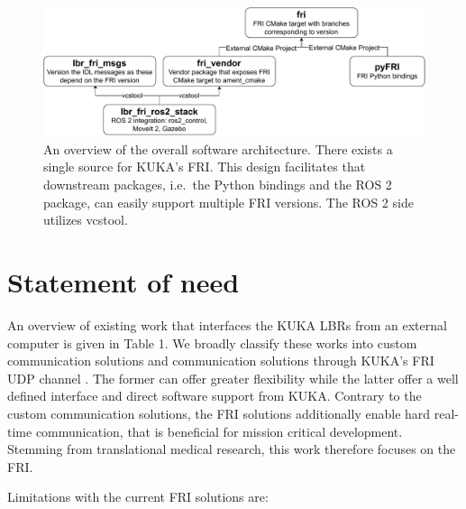 \begin{figure}
\centering
\includegraphics[width=\textwidth]{appendix_1/img/fri_dependency_architecture.pdf}
\caption[An overview of the overall software architecture. There exists
a single source for KUKA's FRI. This design facilitates that downstream
packages, i.e.~the Python bindings and the ROS 2 package, can easily
support multiple FRI versions. The ROS 2 side utilizes
vcstool.\label{fig:fri}]{An overview of the overall software
architecture. There exists a single source for KUKA's FRI. This design
facilitates that downstream packages, i.e.~the Python bindings and the
ROS 2 package, can easily support multiple FRI versions. The ROS 2 side
utilizes vcstool\footnotemark{}.\label{fig:fri}}
\end{figure}

\hypertarget{statement-of-need}{%
\section{Statement of need}\label{statement-of-need}}

An overview of existing work that interfaces the KUKA LBRs from an
external computer is given in Table 1. We broadly classify these works
into custom communication solutions
\cite{ref-iiwa_stack,ref-kuka_sunrise_toolbox,ref-libiiwa} and
communication solutions through KUKA's FRI UDP channel 
\cite{ref-iiwa_ros2,ref-iiwa_ros}. The
former can offer greater flexibility while the latter offer a well
defined interface and direct software support from KUKA. Contrary to the
custom communication solutions, the FRI solutions additionally enable
hard real-time communication, that is beneficial for mission critical
development. Stemming from translational medical research, this work
therefore focuses on the FRI.

Limitations with the current FRI solutions are:

